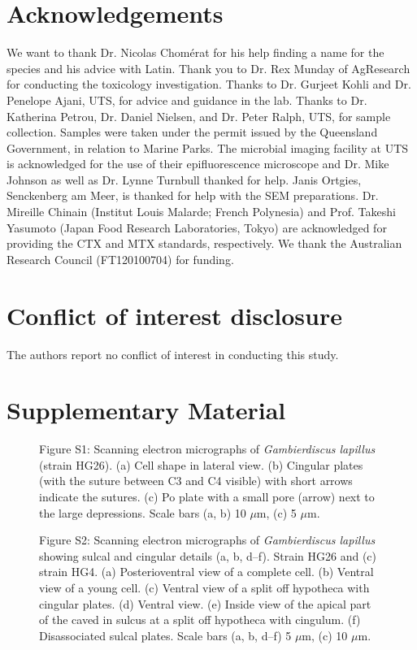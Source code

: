 \documentclass[12pt]{article}
\begin{document}
\newpage
\section{Acknowledgements}
We want to thank Dr. Nicolas Chom\'erat for his help finding a name for the species and his advice with Latin. 
Thank you to Dr. Rex Munday of AgResearch for conducting the toxicology investigation. 
Thanks to Dr. Gurjeet Kohli and Dr. Penelope Ajani, UTS, for advice and guidance in the lab. 
Thanks to Dr. Katherina Petrou, Dr. Daniel Nielsen, and Dr. Peter Ralph, UTS, for sample collection. 
Samples were taken under the permit issued by the Queensland Government, in relation to Marine Parks. 
The microbial imaging facility at UTS is acknowledged for the use of their epifluorescence microscope and Dr. Mike Johnson as well as Dr. Lynne Turnbull thanked for help. 
Janis Ortgies, Senckenberg am Meer, is thanked for help with the SEM preparations. 
Dr. Mireille Chinain (Institut Louis Malarde; French Polynesia) and Prof. Takeshi Yasumoto (Japan Food Research Laboratories, Tokyo) are acknowledged for providing the CTX and MTX standards, respectively. 
We thank the Australian Research Council (FT120100704) for funding.

\section{Conflict of interest disclosure}
The authors report no conflict of interest in conducting this study.
\newpage


\section{Supplementary Material}
\FloatBarrier 
\begin{figure} 
\caption{Figure S1: Scanning electron micrographs of \textit{Gambierdiscus lapillus} (strain HG26). (a) Cell shape in lateral view. (b) Cingular plates (with the suture between C3 and C4 visible) with short arrows indicate the sutures. (c) Po plate with a small pore (arrow) next to the large depressions. Scale bars (a, b) 10 $\mu$m, (c) 5 $\mu$m.} 
\label{fig:s1SEM}
\end{figure} 
\FloatBarrier

\FloatBarrier 
\begin{figure} 
\caption{Figure S2: Scanning electron micrographs of \textit{Gambierdiscus lapillus} showing sulcal and cingular details (a, b, d–f). Strain HG26 and (c) strain HG4. (a) Posterioventral view of a complete cell. (b) Ventral view of a young cell. (c) Ventral view of a split off hypotheca with cingular plates. (d) Ventral view. (e) Inside view of the apical part of the caved in sulcus at a split off hypotheca with cingulum. (f) Disassociated sulcal plates. Scale bars (a, b, d–f) 5 $\mu$m, (c) 10 $\mu$m.} 
\label{fig:s2SEM}
\end{figure} 
\FloatBarrier
\end{document}
